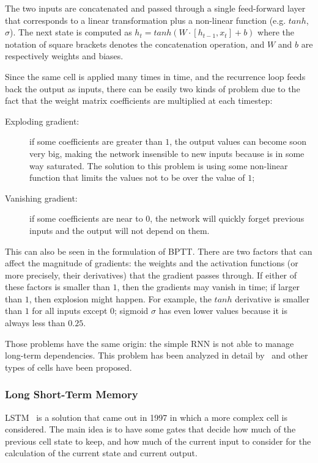 The two inputs are concatenated and passed through a single feed-forward layer that corresponds to a linear transformation plus a non-linear function (e.g. $tanh$,  $\sigma$). The next state is computed as  $h_{t}=tanh \left( W\cdot  \left[ h_{t-1}, x_{t} \right]  + b \right)$  where the notation of square brackets denotes the concatenation operation, and $W$ and  $b$  are respectively weights and biases.

Since the same cell is applied many times in time, and the recurrence loop feeds back the output as inputs, there can be easily two kinds of problem due to the fact that the weight matrix coefficients are multiplied at each timestep:

\begin{description}
	\item[Exploding gradient:] if some coefficients are greater than $1$, the output values can become soon very big, making the network insensible to new inputs because is in some way saturated. The solution to this problem is using some non-linear function that limits the values not to be over the value of $1$;
	\item[Vanishing gradient:] if some coefficients are near to $0$, the network will quickly forget previous inputs and the output will not depend on them.
\end{description}
This can also be seen in the formulation of BPTT. There are two factors that can affect the magnitude of gradients: the weights and the activation functions (or more precisely, their derivatives) that the gradient passes through. If either of these factors is smaller than $1$, then the gradients may vanish in time; if larger than $1$, then explosion might happen. For example, the  $tanh$  derivative is smaller than $1$ for all inputs except $0$; sigmoid  $\sigma$  has even lower values because it is always less than  $0.25$.

Those problems have the same origin: the simple RNN is not able to manage long-term dependencies. This problem has been analyzed in detail by~\cite{bengio1994learning,hochreiter1998vanishing} and other types of cells have been proposed.

\subsubsection{Long Short-Term Memory}
LSTM~\cite{hochreiter1997long} is a solution that came out in 1997 in which a more complex cell is considered. The main idea is to have some gates that decide how much of the previous cell state to keep, and how much of the current input to consider for the calculation of the current state and current output.

